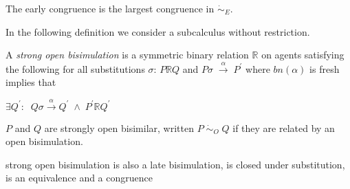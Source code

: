 \begin{proposition}
  The early congruence is the largest congruence in $\dot{\sim}_{E}$.  
\end{proposition}

In the following definition we consider a subcalculus without restriction. 
\begin{definition}
  A \emph{strong open bisimulation} is a symmetric binary relation $\mathbb{R}$ on agents satisfying the following for all substitutions $\sigma$: $P\mathbb{R} Q$ and $P\sigma\; \xrightarrow{\alpha}\; P^{'}$ where $bn(\alpha)$ is fresh implies that
  \begin{center}
    $\exists Q^{'}:\;\; Q\sigma\xrightarrow{\alpha}Q^{'}\; \wedge\; P^{'}\mathbb{R}Q^{'}$
  \end{center}
  $P$ and $Q$ are strongly open bisimilar, written $P\; \dot{\sim}_{O}\; Q$ if they are related by an open bisimulation.
\end{definition}

\begin{proposition}
  strong open bisimulation is also a late bisimulation, is closed under substitution, is an equivalence and a congruence
\end{proposition}



